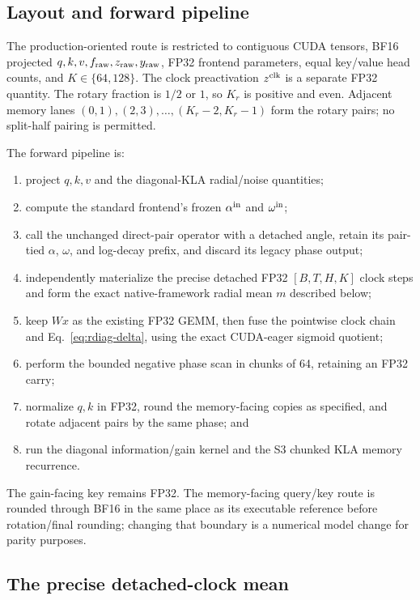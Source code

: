 \documentclass[11pt]{article}
\begin{document}
\subsection{Layout and forward pipeline}

The production-oriented route is restricted to contiguous CUDA tensors, BF16 projected
$q,k,v,f_{\rm raw},z_{\rm raw},y_{\rm raw}$, FP32 frontend parameters, equal key/value head counts,
and $K\in\{64,128\}$.  The clock preactivation $z^{\rm clk}$ is a separate FP32 quantity.
The rotary fraction is $1/2$ or $1$, so $K_r$ is positive and even.  Adjacent memory lanes
$(0,1),(2,3),\ldots,(K_r-2,K_r-1)$ form the rotary pairs; no split-half pairing is permitted.

The forward pipeline is:
\begin{enumerate}[leftmargin=1.8em]
  \item project $q,k,v$ and the diagonal-KLA radial/noise quantities;
  \item compute the standard frontend's frozen $\alpha^{\rm in}$ and $\omega^{\rm in}$;
  \item call the unchanged direct-pair operator with a detached angle, retain its pair-tied
        $\alpha$, $\omega$, and log-decay prefix, and discard its legacy phase output;
  \item independently materialize the precise detached FP32 $[B,T,H,K]$ clock steps and form the
        exact native-framework radial mean $m$ described below;
  \item keep $Wx$ as the existing FP32 GEMM, then fuse the pointwise clock chain and
        Eq.~\eqref{eq:rdiag-delta}, using the exact CUDA-eager sigmoid quotient;
  \item perform the bounded negative phase scan in chunks of 64, retaining an FP32 carry;
  \item normalize $q,k$ in FP32, round the memory-facing copies as specified, and rotate adjacent
        pairs by the same phase; and
  \item run the diagonal information/gain kernel and the S3 chunked KLA memory recurrence.
\end{enumerate}
The gain-facing key remains FP32.  The memory-facing query/key route is rounded through BF16 in the
same place as its executable reference before rotation/final rounding; changing that boundary is a
numerical model change for parity purposes.

\subsection{The precise detached-clock mean}
\label{sec:precise-mean}
\end{document}
